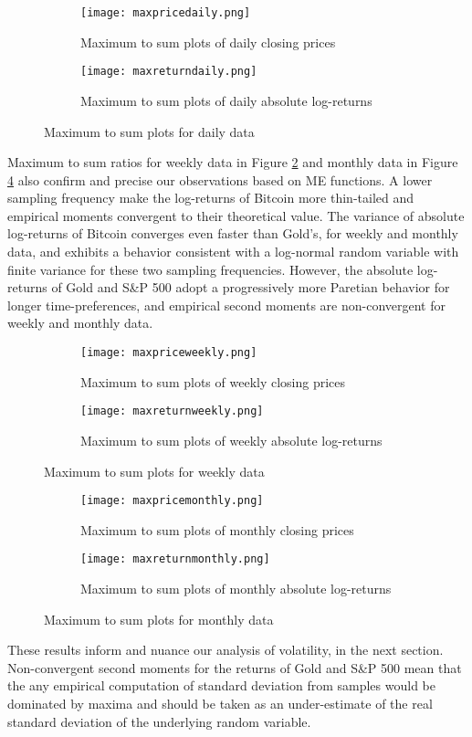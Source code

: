 \documentclass[12pt]{article}
\begin{document}
\begin{figure}[H]
\centering
\begin{subfigure}[b]{\textwidth}

\texttt{[image: maxpricedaily.png]}\hfill

\caption{Maximum to sum plots of daily closing prices}
\end{subfigure}
\begin{subfigure}[b]{\textwidth}
\texttt{[image: maxreturndaily.png]}\hfill
\caption{Maximum to sum plots of daily absolute log-returns}
\end{subfigure}
\caption{Maximum to sum plots for daily data }
\label{maxdaily}
\end{figure}

Maximum to sum ratios for weekly data in Figure \ref{maxweekly} and monthly data in Figure \ref{maxmonthly} also confirm and precise our observations based on ME functions. A lower sampling frequency make the log-returns of Bitcoin more thin-tailed and empirical moments convergent to their theoretical value. The variance of absolute log-returns of Bitcoin converges even faster than Gold's, for weekly and monthly data, and exhibits a behavior consistent with a log-normal random variable with finite variance for these two sampling frequencies. However, the absolute log-returns of Gold and S\&P 500 adopt a progressively more Paretian behavior for longer time-preferences, and empirical second moments are non-convergent for weekly and monthly data.  
\begin{figure}[H]
\centering
\begin{subfigure}[b]{\textwidth}
\texttt{[image: maxpriceweekly.png]}\hfill
\caption{Maximum to sum plots of weekly closing prices}
\end{subfigure}
\begin{subfigure}[b]{\textwidth}
\texttt{[image: maxreturnweekly.png]}\hfill
\caption{Maximum to sum plots of weekly absolute log-returns}
\end{subfigure}
\caption{Maximum to sum plots for weekly data }
\label{maxweekly}
\end{figure}
\begin{figure}[H]
\centering
\begin{subfigure}[b]{\textwidth}
\texttt{[image: maxpricemonthly.png]}\hfill
\caption{Maximum to sum plots of monthly closing prices}
\end{subfigure}
\begin{subfigure}[b]{\textwidth}
\texttt{[image: maxreturnmonthly.png]}\hfill
\caption{\label{maxmonthlyreturn} Maximum to sum plots of monthly absolute log-returns}
\end{subfigure}
\caption{Maximum to sum plots for monthly data }
\label{maxmonthly}
\end{figure}
These results inform and nuance our analysis of volatility, in the next section. Non-convergent second moments for the returns of Gold and S\&P 500 mean that the any empirical computation of standard deviation from samples would be dominated by maxima and should be taken as an under-estimate of the real standard deviation of the underlying random variable.
\end{document}
